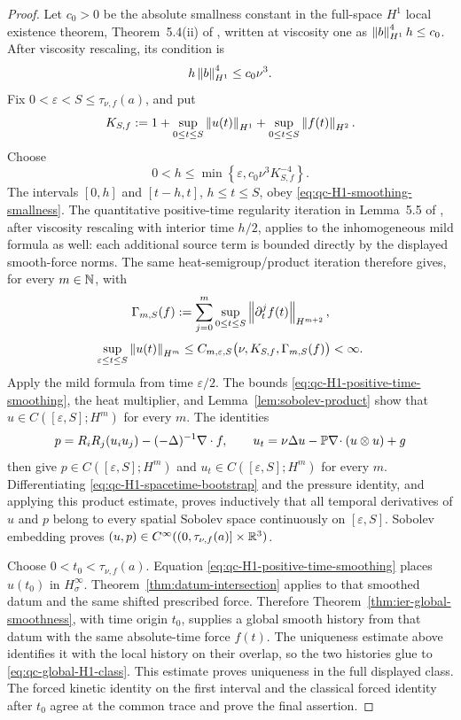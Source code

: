 \begin{proof}
Let \(c_0>0\) be the absolute smallness constant in the full-space
\(H^1\) local existence theorem, Theorem~5.4(ii) of \cite{Tao2013},
written at viscosity one as
\(\left\lVert b\right\rVert_{H^1}^4h\le c_0\).  After viscosity rescaling, its condition is
\begin{equation}
 h\left\lVert b\right\rVert_{H^1}^4\le c_0\nu^3.
 \label{eq:qc-H1-smoothing-smallness}
\end{equation}
Fix \(0<\varepsilon<S\le\tau_{\nu,f}(a)\), and put
\[
 K_{S,f}:=1+\sup_{0\le t\le S}\left\lVert u(t)\right\rVert_{H^1}
 +\sup_{0\le t\le S}\left\lVert f(t)\right\rVert_{H^2}.
\]
Choose
\[
 0<h\le\min\left\{\varepsilon,
 c_0\nu^3K_{S,f}^{-4}\right\}.
\]
The intervals \([0,h]\) and \([t-h,t]\), \(h\le t\le S\), obey
\eqref{eq:qc-H1-smoothing-smallness}.  The quantitative positive-time
regularity iteration in Lemma~5.5 of \cite{Tao2013}, after viscosity
rescaling with interior time \(h/2\), applies to the inhomogeneous mild
formula as well: each additional source term is bounded directly by the
displayed smooth-force norms.  The same heat-semigroup/product iteration
therefore gives, for every \(m\in\mathbb N\), with
\[
 \Gamma_{m,S}(f):=
 \sum_{j=0}^{m}\sup_{0\le t\le S}
 \left\lVert \partial_t^jf(t)\right\rVert_{H^{m+2}},
\]
\begin{equation}
 \sup_{\varepsilon\le t\le S}\left\lVert u(t)\right\rVert_{H^m}
 \le C_{m,\varepsilon,S}
 \bigl(\nu,K_{S,f},\Gamma_{m,S}(f)\bigr)<\infty.
 \label{eq:qc-H1-positive-time-smoothing}
\end{equation}
Apply the mild formula from time \(\varepsilon/2\).  The bounds
\eqref{eq:qc-H1-positive-time-smoothing}, the heat multiplier, and
Lemma~\ref{lem:sobolev-product} show that
\(u\in C([\varepsilon,S];H^m)\) for every \(m\).  The identities
\begin{equation}
 p=R_iR_j(u_i u_j)-(-\Delta)^{-1}\nabla\cdot f,
 \qquad
 u_t=\nu\Delta u-\mathbb P\nabla\!\cdot(u\otimes u)+g
 \label{eq:qc-H1-spacetime-bootstrap}
\end{equation}
then give
\(p\in C([\varepsilon,S];H^m)\) and
\(u_t\in C([\varepsilon,S];H^m)\) for every \(m\).  Differentiating
\eqref{eq:qc-H1-spacetime-bootstrap} and the pressure identity, and applying
this product estimate, proves inductively that all temporal derivatives
of \(u\) and \(p\) belong to every spatial Sobolev space continuously on
\([\varepsilon,S]\).  Sobolev embedding proves
\((u,p)\in C^\infty((0,\tau_{\nu,f}(a)]\times\mathbb R^3)\).

Choose \(0<t_0<\tau_{\nu,f}(a)\).  Equation
\eqref{eq:qc-H1-positive-time-smoothing} places \(u(t_0)\) in
\(H^\infty_\sigma\).  Theorem~\ref{thm:datum-intersection} applies to that
smoothed datum and the same shifted prescribed force.  Therefore
Theorem~\ref{thm:ier-global-smoothness}, with time origin \(t_0\),
supplies a global smooth history from that datum with the
same absolute-time force \(f(t)\).  The
uniqueness estimate above identifies it with the local history on their
overlap, so the two histories glue to \eqref{eq:qc-global-H1-class}.
This estimate proves uniqueness in the full displayed class.  The forced
kinetic identity on the first interval and the classical forced identity
after \(t_0\) agree
at the common trace and prove the final assertion.
\end{proof}

